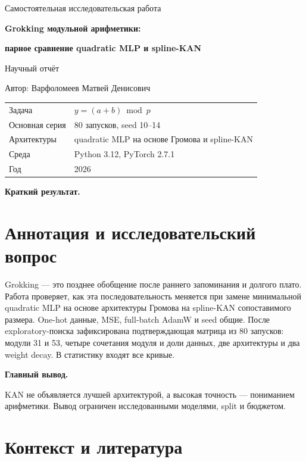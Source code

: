 \documentclass[11pt,a4paper]{article}
\begin{document}
\begin{titlepage}
\vspace*{24mm}
{\color{accent}\large Самостоятельная исследовательская работа\par}
\vspace{12mm}
{\Huge\bfseries Grokking модульной арифметики:\par}
\vspace{3mm}
{\LARGE\bfseries парное сравнение quadratic MLP и spline-KAN\par}
\vspace{14mm}
{\large Научный отчёт\par}
\vspace{4mm}
{\large Автор: Варфоломеев Матвей Денисович\par}
\vfill
\begin{tabular}{@{}ll@{}}
Задача & $y=(a+b)\bmod p$ \\
Основная серия & 80 запусков, seed 10--14 \\
Архитектуры & quadratic MLP на основе Громова и spline-KAN \\
Среда & Python 3.12, PyTorch 2.7.1 \\
Год & 2026
\end{tabular}
\vspace{12mm}

\textbf{Краткий результат.} \MainResultShort
\end{titlepage}

\section{Аннотация и исследовательский вопрос}

Grokking --- это позднее обобщение после раннего запоминания и долгого плато.
Работа проверяет, как эта последовательность меняется при замене минимальной
quadratic MLP на основе архитектуры Громова на spline-KAN сопоставимого
размера. One-hot данные, MSE, full-batch AdamW и seed общие. После
exploratory-поиска зафиксирована подтверждающая матрица из 80 запусков:
модули 31 и 53, четыре сочетания модуля и доли данных, две архитектуры и два
weight decay. В статистику входят все кривые.

\textbf{Главный вывод.} \MainResultLong

KAN не объявляется лучшей архитектурой, а высокая точность --- пониманием
арифметики. Вывод ограничен исследованными моделями, split и бюджетом.

\section{Контекст и литература}
\end{document}

